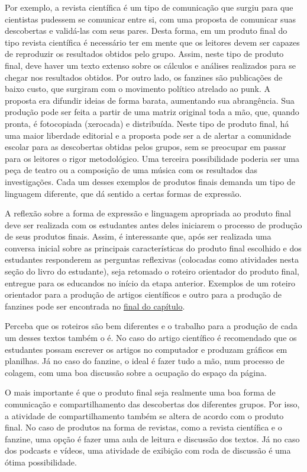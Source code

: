 \begin{paginatexto}
Por exemplo, a revista científica é um tipo de comunicação que surgiu para que cientistas pudessem se comunicar entre si, com uma proposta de comunicar suas descobertas e validá-las com seus pares. Desta forma, em um produto final do tipo revista científica é necessário ter em mente que os leitores devem ser capazes de reproduzir os resultados obtidos pelo grupo. Assim, neste tipo de produto final, deve haver um texto extenso sobre os cálculos e análises realizados para se chegar nos resultados obtidos. Por outro lado, os fanzines são publicações de baixo custo, que surgiram com o movimento político atrelado ao punk. A proposta era difundir ideias de forma barata, aumentando sua abrangência. Sua produção pode ser feita a partir de uma matriz original toda a mão, que, quando pronta, é fotocopiada (xerocada) e distribuída. Neste tipo de produto final, há uma maior liberdade editorial e a proposta pode ser a de alertar a comunidade escolar para as descobertas obtidas pelos grupos, sem se preocupar em passar para os leitores o rigor metodológico. Uma terceira possibilidade poderia ser uma peça de teatro ou a composição de uma música com os resultados das investigações. Cada um desses exemplos de produtos finais demanda um tipo de linguagem diferente, que dá sentido a certas formas de expressão. 

A reflexão sobre a forma de expressão e linguagem apropriada ao produto final deve ser realizada com os estudantes antes deles iniciarem o processo de produção de seus produtos finais. Assim, é interessante que, após ser realizada uma conversa inicial sobre as principais características do produto final escolhido e dos estudantes responderem as perguntas reflexivas (colocadas como atividades nesta seção do livro do estudante), seja retomado o roteiro orientador do produto final, entregue para os educandos no início da etapa anterior. Exemplos de um roteiro orientador para a produção de artigos científicos e outro para a produção de fanzines pode ser encontrada no \hyperref[roteiro-artigo]{final do capítulo}. 

Perceba que os roteiros são bem diferentes e o trabalho para a produção de cada um desses textos também o é. No caso do artigo científico é recomendado que os estudantes possam escrever os artigos no computador e produzam gráficos em planilhas. Já no caso do fanzine, o ideal é fazer tudo a mão, num processo de colagem, com uma boa discussão sobre a ocupação do espaço da página. 

O mais importante é que o produto final seja realmente uma boa forma de comunicação e compartilhamento das descobertas dos diferentes grupos. Por isso, a atividade de compartilhamento também se altera de acordo com o produto final. No caso de produtos na forma de revistas, como a revista científica e o fanzine, uma opção é fazer uma aula de leitura e discussão dos textos. Já no caso dos podcasts e vídeos, uma atividade de exibição com roda de discussão é uma ótima possibilidade. 
\clearpage
\end{paginatexto}

